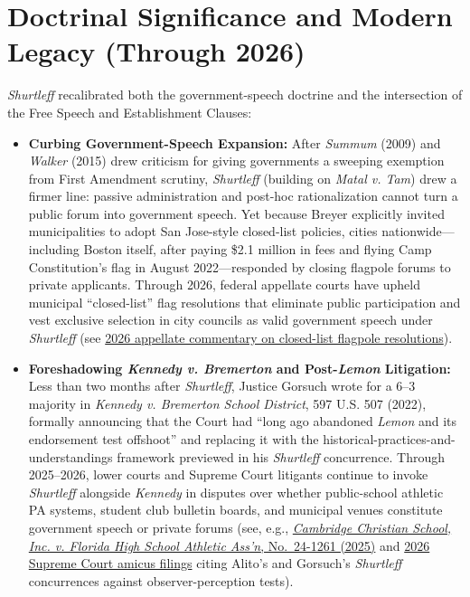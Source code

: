 \documentclass[12pt]{article}
\begin{document}
\section{Doctrinal Significance and Modern Legacy (Through 2026)}
\textit{Shurtleff} recalibrated both the government-speech doctrine and the intersection of the Free Speech and Establishment Clauses:
\begin{itemize}
  \item \textbf{Curbing Government-Speech Expansion:} After \textit{Summum} (2009) and \textit{Walker} (2015) drew criticism for giving governments a sweeping exemption from First Amendment scrutiny, \textit{Shurtleff} (building on \textit{Matal v. Tam}) drew a firmer line: passive administration and post-hoc rationalization cannot turn a public forum into government speech. Yet because Breyer explicitly invited municipalities to adopt San Jose-style closed-list policies, cities nationwide---including Boston itself, after paying \$2.1 million in fees and flying Camp Constitution's flag in August 2022---responded by closing flagpole forums to private applicants. Through 2026, federal appellate courts have upheld municipal ``closed-list'' flag resolutions that eliminate public participation and vest exclusive selection in city councils as valid government speech under \textit{Shurtleff} (see \href{https://www.casemine.com/commentary/us/closing-a-flagpole-forum-a-closed-list-flag-resolution-and-removal-of-public-participation-converts-a-municipal-flag-display-into-government-speech/view}{2026 appellate commentary on closed-list flagpole resolutions}).
  \item \textbf{Foreshadowing \textit{Kennedy v. Bremerton} and Post-\textit{Lemon} Litigation:} Less than two months after \textit{Shurtleff}, Justice Gorsuch wrote for a 6--3 majority in \textit{Kennedy v. Bremerton School District}, 597 U.S. 507 (2022), formally announcing that the Court had ``long ago abandoned \textit{Lemon} and its endorsement test offshoot'' and replacing it with the historical-practices-and-understandings framework previewed in his \textit{Shurtleff} concurrence. Through 2025--2026, lower courts and Supreme Court litigants continue to invoke \textit{Shurtleff} alongside \textit{Kennedy} in disputes over whether public-school athletic PA systems, student club bulletin boards, and municipal venues constitute government speech or private forums (see, e.g., \href{https://www.supremecourt.gov/DocketPDF/24/24-1261/364872/20250710122058250_24-1261%20Amicus%20Brief.pdf}{\textit{Cambridge Christian School, Inc. v. Florida High School Athletic Ass'n}, No.~24-1261 (2025)} and \href{https://www.supremecourt.gov/DocketPDF/25/25-906/399910/20260304094332023_25-906%20Amicus%20Brief%20of%20The%20American%20Center%20for%20Law%20and%20Justice.pdf}{2026 Supreme Court amicus filings} citing Alito's and Gorsuch's \textit{Shurtleff} concurrences against observer-perception tests).
\end{itemize}
\end{document}
